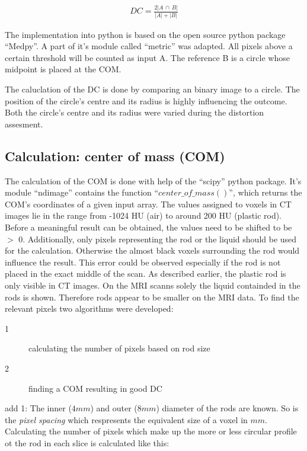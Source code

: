 \begin{align}
DC = \frac{2 |A \, \cap \, B|}{|A| + |B|}
\end{align}

The implementation into python is based on the open source python package ``Medpy''. \cite{MedPy} A part of it's module called ``metric'' was adapted. \cite{MedPy_dc-code}
All pixels above a certain threshold will be counted as input A. The reference B is a circle whose midpoint is placed at the COM.

The caluclation of the DC is done by comparing an binary image to a circle. The position of the circle's centre and its radius is highly influencing the outcome.
Both the circle's centre and its radius were varied during the distortion assesment.


\subsection{Calculation: center of mass (COM)}

The calculation of the COM is done with help of the ``scipy'' python package.
It's module ``ndimage'' contains the function ``$center\_of\_mass()$'', which returns the COM's coordinates of a given input array.
The values assigned to voxels in CT images lie in the range from -1024 HU (air) to around 200 HU (plastic rod).
Before a meaningful result can be obtained, the values need to be shifted to be $>$ 0.
Additionally, only pixels representing the rod or the liquid should be used for the calculation.
Otherwise the almost black voxels surrounding the rod would influence the result.
This error could be observed especially if the rod is not placed in the exact middle of the scan.
As described earlier, the plastic rod is only visible in CT images. On the MRI scanns solely the liquid containded in the rods is shown. Therefore rods appear to be smaller on the MRI data.
To find the relevant pixels two algorithms were developed:

\begin{description}
 \item[1] calculating the number of pixels based on rod size
 \item[2] finding a COM resulting in good DC
\end{description}

add 1:
The inner ($4mm$) and outer ($8mm$) diameter of the rods are known. So is the \textit{pixel spacing} which respresents the equivalent size of a voxel in $mm$.
Calculating the number of pixels which make up the more or less circular profile ot the rod in each slice is calculated like this:

